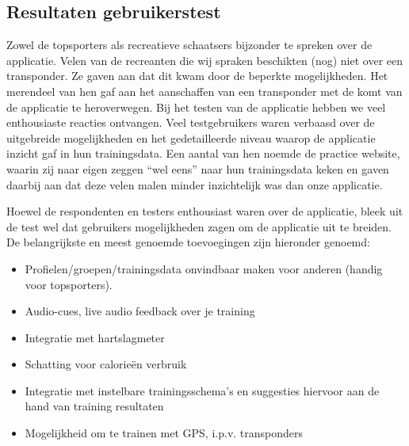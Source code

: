 \subsection{Resultaten gebruikerstest}
Zowel de topsporters als recreatieve schaatsers bijzonder te spreken over de applicatie. Velen van de recreanten die wij spraken beschikten (nog) niet over een transponder. Ze gaven aan dat dit kwam door de beperkte mogelijkheden. Het merendeel van hen gaf aan het aanschaffen van een transponder met de komt van de applicatie te heroverwegen. Bij het testen van de applicatie hebben we veel enthousiaste reacties ontvangen. Veel testgebruikers waren verbaasd over de uitgebreide mogelijkheden en het gedetailleerde niveau waarop de applicatie inzicht gaf in hun trainingsdata. Een aantal van hen noemde de \mylaps practice website, waarin zij naar eigen zeggen ``wel eens'' naar hun trainingsdata keken en gaven daarbij aan dat deze velen malen minder inzichtelijk was dan onze applicatie.

Hoewel de respondenten en testers enthousiast waren over de applicatie, bleek uit de test wel dat gebruikers mogelijkheden zagen om de applicatie uit te breiden. De belangrijkste en meest genoemde toevoegingen zijn hieronder genoemd:
\begin{itemize}
\item Profielen/groepen/trainingsdata onvindbaar maken voor anderen (handig voor topsporters).
\item Audio-cues, live audio feedback over je training 
\item Integratie met hartslagmeter
\item Schatting voor calorieën verbruik
\item Integratie met instelbare trainingsschema's en suggesties hiervoor aan de hand van training resultaten
\item Mogelijkheid om te trainen met GPS, i.p.v. transponders
\end{itemize}